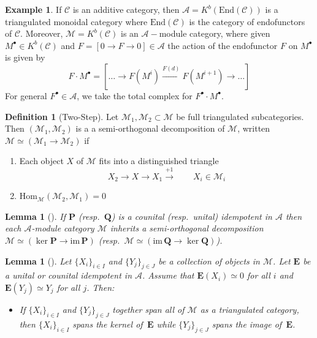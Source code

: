 \documentclass[10pt]{article}
\numberwithin{theorem}{section}
\newtheorem{lemma}[theorem]{Lemma}
\theoremstyle{definition}
\newtheorem{definition}[theorem]{Definition}
\newtheorem{example}{Example}
\renewcommand{\hom}{\mathrm{Hom}}
\newcommand{\Ac}{\mathcal{A}}
\newcommand{\Cc}{\mathcal{C}}
\newcommand{\Mc}{\mathcal{M}}
\newcommand{\0}{\ \raisebox{-2ex}{\begin{tikzpicture}[xscale=0.25,yscale=0.3,thick,baseline]
 \draw (0,0) -- (0,3); 
\end{tikzpicture}}}
\renewcommand{\1}{\ \raisebox{-2ex}{\begin{tikzpicture}[xscale=0.25,yscale=0.3,thick,baseline]
 \draw (0,0) -- (0,1);
 \draw (0,2) -- (0,3);
 \node[dot] at (0,1) {};
  \node[dot] at (0,2) {};
\end{tikzpicture}}}
\begin{document}
\begin{example}
    If $\Cc$ is an additive category, then $\Ac=K^b( \mathrm{End}(\Cc))$ is a triangulated monoidal category where $\mathrm{End}(\Cc)$ is the category of endofunctors of $\Cc$. Moreover, $\Mc=K^b(\Cc)$ is an $\Ac-$module category, where given $M^\bullet\in K^b(\Cc)$ and $F= [0\to \boxed{F}\to 0]\in \Ac$ the action of the endofunctor $F$ on $M^\bullet$ is given by
\[F\cdot M^\bullet= [\ldots \to F(M^i)\xrightarrow{F(d)} F(M^{i+1})\to \ldots ]\]
For general $F^\bullet\in \Ac$, we take the total complex for $F^\bullet\cdot M^\bullet$.
\end{example}

\begin{definition}[Two-Step]
Let $\Mc_1, \Mc_2\subset \Mc$ be full triangulated subcategories. Then $(\Mc_1, \Mc_2)$ is a a semi-orthogonal decomposition of $\Mc$, written $\Mc\simeq (\Mc_1\to \Mc_2)$ if 
\begin{enumerate}[(1)]
\item Each object $X$ of $\Mc$ fits into a distinguished triangle
\[ X_2\to X \to X_1\xrightarrow{+1} \qquad X_i\in \Mc_i \]
 \item $\hom_{\Mc}(\Mc_2, \Mc_1)=0$
\end{enumerate}
\end{definition}


\begin{lemma}[{\cite[Corollary 4.14]{GHMN19}}]
\label{ghmn414}
    If $\mathbf{P}$ (resp.\ $\mathbf{Q}$) is a counital (resp.\ unital) idempotent in $\mathcal{A}$ then each $\mathcal{A}$-module category $\mathcal{M}$ inherits a semi-orthogonal decomposition $\mathcal{M} \simeq (\ker \mathbf{P} \to \mathrm{im}\, \mathbf{P})$ (resp.\ $\mathcal{M} \simeq (\mathrm{im}\, \mathbf{Q} \to \ker \mathbf{Q})$).
\end{lemma}


\begin{lemma}[{\cite[Lemma 4.17]{GHMN19}}]
\label{ghmn417}
    Let $\{X_i\}_{i\in I}$ and $\{Y_j\}_{j\in J}$ be a collection of objects in $\mathcal{M}$. Let $\mathbf{E}$ be a unital or counital idempotent in $\mathcal{A}$. Assume that $\mathbf{E}(X_i) \simeq 0$ for all $i$ and $\mathbf{E}(Y_j) \simeq Y_j$ for all $j$. Then:
\begin{itemize}
    \item[(3)] If $\{X_i\}_{i\in I}$ and $\{Y_j\}_{j\in J}$ together span all of $\mathcal{M}$ as a triangulated category, then $\{X_i\}_{i\in I}$ spans the kernel of $\, \mathbf{E}$ while $\{Y_j\}_{j\in J}$ spans the image of $\, \mathbf{E}$.
\end{itemize}
\end{lemma}
\end{document}
